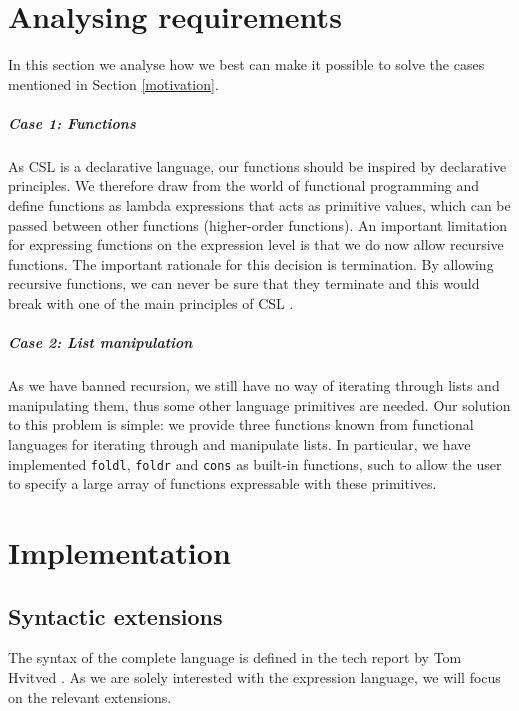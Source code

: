 \documentclass[10pt,a4paper,final,oneside,openany,article]{memoir}
\begin{document}
\chapter{Analysing requirements}
In this section we analyse how we best can make it possible to solve
the cases mentioned in Section \ref{motivation}.

\paragraph{Case 1: Functions} As CSL is a declarative language, our
functions should be inspired by declarative principles. We therefore
draw from the world of functional programming and define functions as
lambda expressions that acts as primitive values, which can be passed
between other functions (higher-order functions). An important
limitation for expressing functions on the expression level is that we
do now allow recursive functions. The important rationale for this
decision is termination. By allowing recursive functions, we can never
be sure that they terminate and this would break with one of the
main principles of CSL .

\paragraph{Case 2: List manipulation}
As we have banned recursion, we still have no way of iterating through
lists and manipulating them, thus some other language primitives are
needed. Our solution to this problem is simple: we provide three
functions known from functional languages for iterating through and
manipulate lists. In particular, we have implemented \lstinline{foldl},
\lstinline{foldr} and \lstinline{cons} as built-in functions, such to
allow the user to specify a large array of functions expressable with
these primitives.


\chapter{Implementation}
\section{Syntactic extensions}
The syntax of the complete language is defined in the tech report by
Tom Hvitved \cite[p. 13]{hvitved10}. As we are solely interested with
the expression language, we will focus on the relevant extensions.
\end{document}
